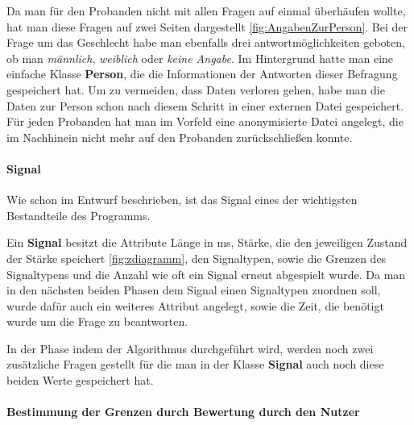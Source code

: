 Da man f{\"u}r den Probanden nicht mit allen Fragen auf einmal {\"u}berh{\"a}ufen wollte, hat man diese Fragen auf zwei Seiten dargestellt \autoref{fig:AngabenZurPerson}. Bei der Frage um das Geschlecht habe man ebenfalls drei antwortmöglichkeiten geboten, ob man \textit{männlich}, \textit{weiblich} oder \textit{keine Angabe}.
Im Hintergrund hatte man eine einfache Klasse \textbf{Person}, die die Informationen der Antworten dieser Befragung gespeichert hat. Um zu vermeiden, dass Daten verloren gehen, habe man die Daten zur Person schon nach diesem Schritt in einer externen Datei gespeichert. F{\"u}r jeden Probanden hat man im Vorfeld eine anonymisierte Datei angelegt, die im Nachhinein nicht mehr auf den Probanden zur{\"u}ckschlie{\ss}en konnte.  

\paragraph{Signal}
Wie schon im Entwurf beschrieben, ist das Signal eines der wichtigsten Bestandteile des Programms.

Ein \textbf{Signal} besitzt die Attribute L{\"a}nge in ms, St{\"a}rke, die den jeweiligen Zustand der St{\"a}rke speichert \autoref{fig:zdiagramm}, den Signaltypen, sowie die Grenzen des Signaltypens und die Anzahl wie oft ein Signal erneut abgespielt wurde. 
Da man in den n{\"a}chsten beiden Phasen dem Signal einen Signaltypen zuordnen soll, wurde daf{\"u}r auch ein weiteres Attribut angelegt, sowie die Zeit, die ben{\"o}tigt wurde um die Frage zu beantworten.

In der Phase indem der Algorithmus durchgef{\"u}hrt wird, werden noch zwei zus{\"a}tzliche Fragen gestellt f{\"u}r die man in der Klasse \textbf{Signal} auch noch diese beiden Werte gespeichert hat.


\paragraph {Bestimmung der Grenzen durch Bewertung durch den Nutzer}

